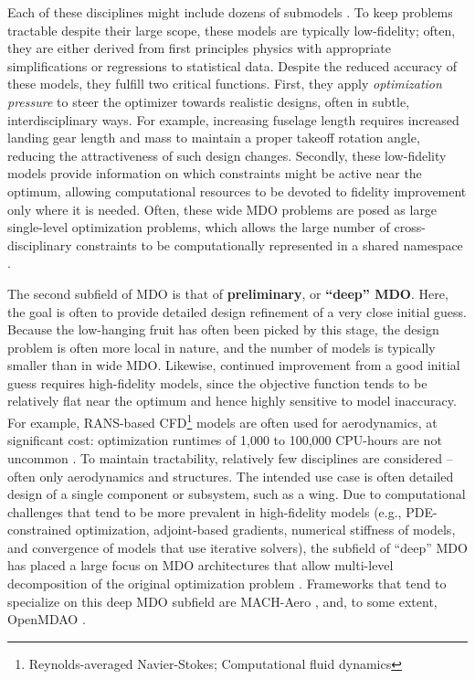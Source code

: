 Each of these disciplines might include dozens of submodels \cite{cruz_weight_1989, torenbeek_synthesis_1976, torenbeek_advanced_2013, drela_tasopt_2010}. To keep problems tractable despite their large scope, these models are typically low-fidelity; often, they are either derived from first principles physics with appropriate simplifications or regressions to statistical data. Despite the reduced accuracy of these models, they fulfill two critical functions. First, they apply \textit{optimization pressure} to steer the optimizer towards realistic designs, often in subtle, interdisciplinary ways. For example, increasing fuselage length requires increased landing gear length and mass to maintain a proper takeoff rotation angle, reducing the attractiveness of such design changes. Secondly, these low-fidelity models provide information on which constraints might be active near the optimum, allowing computational resources to be devoted to fidelity improvement only where it is needed. Often, these wide MDO problems are posed as large single-level optimization problems, which allows the large number of cross-disciplinary constraints to be computationally represented in a shared namespace \cite{hoburg_geometric_2014}.

The second subfield of MDO is that of \textbf{preliminary}, or \textbf{``deep'' MDO}. Here, the goal is often to provide detailed design refinement of a very close initial guess. Because the low-hanging fruit has often been picked by this stage, the design problem is often more local in nature, and the number of models is typically smaller than in wide MDO. Likewise, continued improvement from a good initial guess requires high-fidelity models, since the objective function tends to be relatively flat near the optimum and hence highly sensitive to model inaccuracy. For example, RANS-based CFD\footnote{Reynolds-averaged Navier-Stokes; Computational fluid dynamics} models are often used for aerodynamics, at significant cost: optimization runtimes of 1,000 to 100,000 CPU-hours are not uncommon \cite{kenway_multipoint_2014}. To maintain tractability, relatively few disciplines are considered -- often only aerodynamics and structures. The intended use case is often detailed design of a single component or subsystem, such as a wing. Due to computational challenges that tend to be more prevalent in high-fidelity models (e.g., PDE-constrained optimization, adjoint-based gradients, numerical stiffness of models, and convergence of models that use iterative solvers), the subfield of ``deep'' MDO has placed a large focus on MDO architectures that allow multi-level decomposition of the original optimization problem \cite{martins_multidisciplinary_2013}. Frameworks that tend to specialize on this deep MDO subfield are MACH-Aero \cite{he_aerodynamic_2018}, and, to some extent, OpenMDAO \cite{gray_openmdao_2019}.

